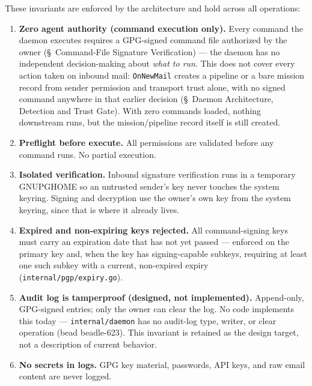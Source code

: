 \documentclass[a4paper,10pt,fleqn]{article}
\begin{document}
These invariants are enforced by the architecture and hold across
all operations:

\begin{enumerate}
  \item \textbf{Zero agent authority (command execution only).}
    Every command the daemon executes requires a GPG-signed command
    file authorized by the owner (\S~Command-File Signature
    Verification) --- the daemon has no independent decision-making
    about \emph{what to run}.  This does not cover every action taken
    on inbound mail: \texttt{OnNewMail} creates a pipeline or a bare
    mission record from sender permission and transport trust alone,
    with no signed command anywhere in that earlier decision
    (\S~Daemon Architecture, Detection and Trust Gate).  With zero
    commands loaded, nothing downstream runs, but the mission/pipeline
    record itself is still created.

  \item \textbf{Preflight before execute.}  All permissions are
    validated before any command runs.  No partial execution.

  \item \textbf{Isolated verification.}  Inbound signature verification
    runs in a temporary GNUPGHOME so an untrusted sender's key never
    touches the system keyring. Signing and decryption use the owner's
    own key from the system keyring, since that is where it already
    lives.

  \item \textbf{Expired and non-expiring keys rejected.}  All
    command-signing keys must carry an expiration date that has not
    yet passed --- enforced on the primary key and, when the key has
    signing-capable subkeys, requiring at least one such subkey with a
    current, non-expired expiry (\texttt{internal/pgp/expiry.go}).

  \item \textbf{Audit log is tamperproof (designed, not
    implemented).}  Append-only, GPG-signed entries; only the owner
    can clear the log.  No code implements this today ---
    \texttt{internal/daemon} has no audit-log type, writer, or clear
    operation (bead beadle-623).  This invariant is retained as the
    design target, not a description of current behavior.

  \item \textbf{No secrets in logs.}  GPG key material, passwords,
    API keys, and raw email content are never logged.


\end{enumerate}
\end{document}

